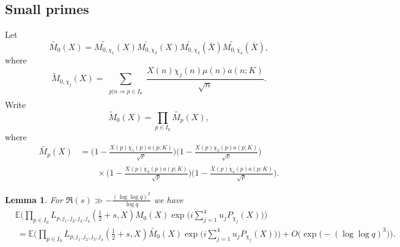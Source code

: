 \documentclass[12pt, reqno]{amsart}
\newcommand{\E}{\mathbb{E}}
\newtheorem{lemma}[theorem]{Lemma}
\numberwithin{equation}{section}
\numberwithin{theorem}{section}
\numberwithin{equation}{section}
\begin{document}
\subsection{Small primes}
Let $$\widetilde{M_0}(X) = \widetilde{M_{0,\chi_1}}(X)\widetilde{M_{0,\chi_2}}(X) \widetilde{M_{0,\overline{\chi_3}}}(\overline{X})\widetilde{M_{0,\overline{\chi_4}}}(\overline{X}),$$
where $$\widetilde{M}_{0, \chi_j}(X)  = \sum_{\substack{ p |n \Rightarrow p \in I_0 \\ }} \frac{ X(n) \chi_j(n) \mu(n) a(n;K) }{\sqrt{n}}.$$
Write 
$$\widetilde{M}_0(X) = \prod_{p \in I_0} \widetilde{M_p}(X),$$
where
\begin{align*} \widetilde{M_p}(X) &= \Big(1 - \frac{X(p) \chi_1(p) a(p;K)}{\sqrt{p}} \Big)\Big(1 - \frac{X(p) \chi_2(p) a(p;K)}{\sqrt{p}} \Big) \\
&\qquad \times  \Big(1 - \frac{\overline{X(p) \chi_3(p)} a(p;K)}{\sqrt{p}} \Big)\Big(1 - \frac{ \overline{X(p) \chi_4(p)} a(p;K)}{\sqrt{p}} \Big).
\end{align*}
\begin{lemma}
\label{no_restriction}
For $\Re(s) \gg - \frac{ (\log \log q)^2}{\log q}$ we have
\begin{align*}
    &\E   \Bigg(  \prod_{p \in I_0} L_{p,j_1,j_2,j_3,j_4} ( \tfrac{1}{2}+s,X ) M_0(X)  \exp\bigg(  i\sum_{j=1}^4 u_jP_{\chi_j}(X)\bigg) \Bigg) \\
    &\  = \E \Bigg(  \prod_{p \in I_0} L_{p,j_1,j_2,j_3,j_4} ( \tfrac{1}{2}+s,X ) \widetilde{M_0}(X)  \exp\bigg(  i\sum_{j=1}^4 u_jP_{\chi_j}(X)\bigg) \Bigg)+ O\Big(  \exp \big(-   (\log \log q)^3\big)\Big).
\end{align*}
\end{lemma}
\end{document}
